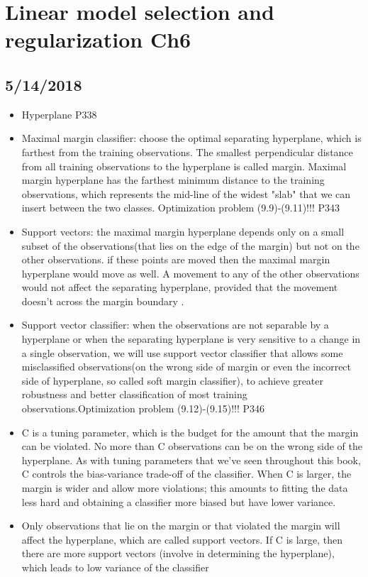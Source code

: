 \documentclass[a4paper, 12pt]{article}
\begin{document}
\section*{Linear model selection and regularization Ch6 }
\subsection{5/14/2018}
\begin{itemize}
	\item Hyperplane P338
	\item Maximal margin classifier: choose the optimal separating hyperplane, which is farthest from the training observations. The smallest perpendicular distance from all training observations to the hyperplane is called margin. Maximal margin hyperplane has the farthest minimum distance to the training observations, which represents the mid-line of the widest "slab" that we can insert between the two classes. Optimization problem (9.9)-(9.11)!!! P343
	\item Support vectors: the maximal margin hyperplane depends only on a small subset of the observations(that lies on the edge of the margin) but not on the other observations.  if these points are moved then the maximal margin hyperplane would move as well. A movement to any of the other observations would not affect the separating hyperplane, provided that the movement doesn't across the margin boundary	.
	\item Support vector classifier: when the observations are not separable by a hyperplane or when the separating hyperplane is very sensitive to a change in a single observation, we will use support vector classifier that allows some misclassified observations(on the wrong side of margin or even the incorrect side of hyperplane, so called soft margin classifier), to achieve greater robustness and better classification of most training observations.Optimization problem (9.12)-(9.15)!!! P346
	\item C is a tuning parameter, which is the budget for the amount that the margin can be violated. No more than C observations can be on the wrong side of the hyperplane. As with tuning parameters that we've seen throughout this book, C controls the bias-variance trade-off of the classifier. When C is larger, the margin is wider and allow more violations; this amounts to fitting the data less hard and obtaining a classifier more biased but have lower variance. 
	\item Only observations that lie on the margin or that violated the margin will affect the hyperplane, which are called support vectors. If C is large, then there are more support vectors (involve in determining the hyperplane), which leads to low variance of the classifier

\end{itemize}
\end{document}
